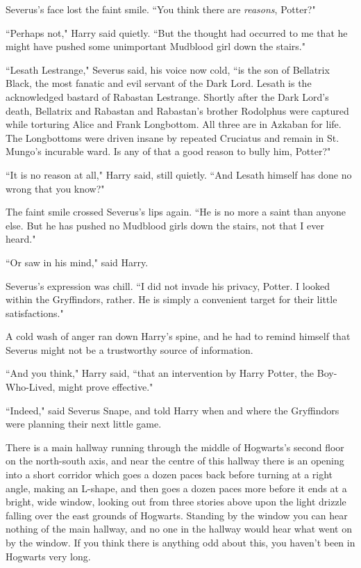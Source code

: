 Severus's face lost the faint smile. ``You think there are \emph{reasons}, Potter?"

``Perhaps not," Harry said quietly. ``But the thought had occurred to me that he might have pushed some unimportant Mudblood girl down the stairs."

``Lesath Lestrange," Severus said, his voice now cold, ``is the son of Bellatrix Black, the most fanatic and evil servant of the Dark Lord. Lesath is the acknowledged bastard of Rabastan Lestrange. Shortly after the Dark Lord's death, Bellatrix and Rabastan and Rabastan's brother Rodolphus were captured while torturing Alice and Frank Longbottom. All three are in Azkaban for life. The Longbottoms were driven insane by repeated Cruciatus and remain in St. Mungo's incurable ward. Is any of that a good reason to bully him, Potter?"

``It is no reason at all," Harry said, still quietly. ``And Lesath himself has done no wrong that you know?"

The faint smile crossed Severus's lips again. ``He is no more a saint than anyone else. But he has pushed no Mudblood girls down the stairs, not that I ever heard."

``Or saw in his mind," said Harry.

Severus's expression was chill. ``I did not invade his privacy, Potter. I looked within the Gryffindors, rather. He is simply a convenient target for their little satisfactions."

A cold wash of anger ran down Harry's spine, and he had to remind himself that Severus might not be a trustworthy source of information.

``And you think," Harry said, ``that an intervention by Harry Potter, the Boy-Who-Lived, might prove effective."

``Indeed," said Severus Snape, and told Harry when and where the Gryffindors were planning their next little game.

\later

There is a main hallway running through the middle of Hogwarts's second floor on the north-south axis, and near the centre of this hallway there is an opening into a short corridor which goes a dozen paces back before turning at a right angle, making an L-shape, and then goes a dozen paces more before it ends at a bright, wide window, looking out from three stories above upon the light drizzle falling over the east grounds of Hogwarts. Standing by the window you can hear nothing of the main hallway, and no one in the hallway would hear what went on by the window. If you think there is anything odd about this, you haven't been in Hogwarts very long.

